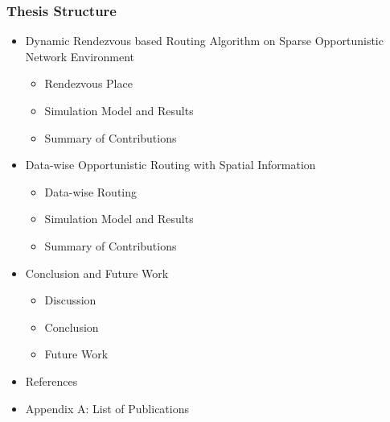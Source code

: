 \documentclass{beamer}
\begin{document}
\begin{frame}
	\frametitle{Thesis Structure}
	\begin{itemize}
\item  Dynamic Rendezvous based Routing Algorithm on Sparse Opportunistic Network Environment 
\begin{itemize}
	\item  Rendezvous Place  
	\item  Simulation Model and Results 
	\item  Summary of Contributions
\end{itemize}
\item  Data-wise Opportunistic Routing with Spatial Information  
\begin{itemize}
	\item  Data-wise Routing 
	\item  Simulation Model and Results 
	\item  Summary of Contributions 
\end{itemize}
\item  Conclusion and Future Work 
\begin{itemize}
	\item  Discussion
	\item  Conclusion 
	\item  Future Work
\end{itemize}
\item References
\item Appendix A: List of Publications
\end{itemize}
\end{frame}





%
%
%
%
%
%

\end{document}

